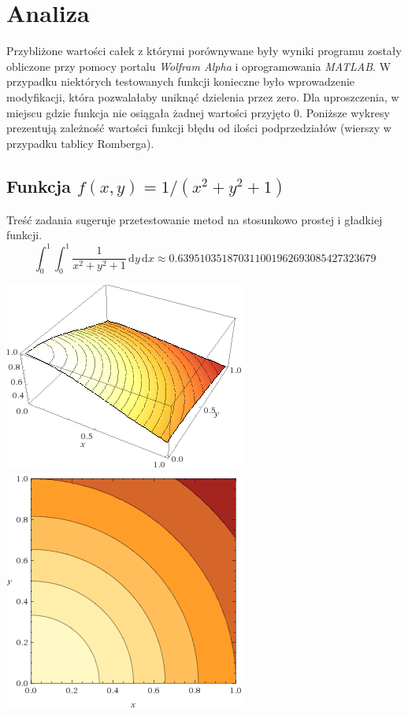 \documentclass[11pt,leqno]{article}
\newcommand{\dvar}[1]{\,\mathrm{d}#1}
\begin{document}
\section{Analiza}

Przybliżone wartości całek z którymi porównywane były wyniki programu zostały obliczone przy pomocy portalu \textit{Wolfram Alpha} i oprogramowania \textit{MATLAB}. W przypadku niektórych testowanych funkcji konieczne było wprowadzenie modyfikacji, która pozwalałaby uniknąć dzielenia przez zero. Dla uproszczenia, w miejscu gdzie funkcja nie osiągała żadnej wartości przyjęto $0$. Poniższe wykresy prezentują zależność wartości funkcji błędu od ilości podprzedziałów (wierszy w przypadku tablicy Romberga). 

\subsection{Funkcja $f(x, y) = 1 / (x^2 + y^2 + 1)$}
Treść zadania sugeruje przetestowanie metod na stosunkowo prostej i gładkiej funkcji.
\[
  \int_{0}^{1} \int_{0}^{1} \frac{1}{x^2 + y^2 + 1} \dvar{y} \dvar{x}
\approx
  0.639510351870311001962693085427323679
\]

\begin{center}
\includegraphics[scale=0.65,natwidth=640,natheight=480]{gfx/test1g.png}
\includegraphics[scale=0.65,natwidth=640,natheight=480]{gfx/test1p.png}\\
\end{center}
\end{document}
